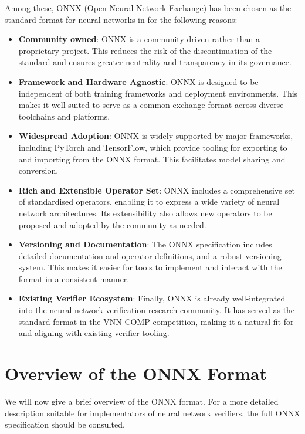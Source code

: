Among these, ONNX (Open Neural Network Exchange) has been chosen as the standard format for neural networks in \vnnlib{} for the following reasons:
\begin{itemize}
\item \textbf{Community owned}: ONNX is a community-driven rather than a proprietary project. This reduces the risk of the discontinuation of the standard and ensures greater neutrality and transparency in its governance.
\item \textbf{Framework and Hardware Agnostic}: ONNX is designed to be independent of both training frameworks and deployment environments. This makes it well-suited to serve as a common exchange format across diverse toolchains and platforms.
\item \textbf{Widespread Adoption}: ONNX is widely supported by major frameworks, including PyTorch and TensorFlow, which provide tooling for exporting to and importing from the ONNX format. This facilitates model sharing and conversion.
\item \textbf{Rich and Extensible Operator Set}: ONNX includes a comprehensive set of standardised operators, enabling it to express a wide variety of neural network architectures. Its extensibility also allows new operators to be proposed and adopted by the community as needed.

\item \textbf{Versioning and Documentation}: The ONNX specification includes detailed documentation and operator definitions, and a robust versioning system. This makes it easier for tools to implement and interact with the format in a consistent manner.

\item \textbf{Existing Verifier Ecosystem}: Finally, ONNX is already well-integrated into the neural network verification research community. It has served as the standard format in the VNN-COMP competition, making it a natural fit for \vnnlib{} and aligning with existing verifier tooling.
\end{itemize}

\section{Overview of the ONNX Format}
\label{sec:onnx_overview}

We will now give a brief overview of the ONNX format. For a more detailed description suitable for implementators of neural network verifiers, the full ONNX specification should be consulted. 

